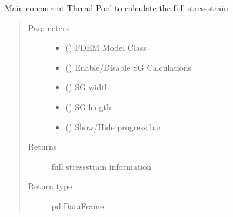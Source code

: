 \documentclass[letterpaper,10pt,english]{sphinxmanual}
\begin{document}
\begin{fulllineitems}
\label{\detokenize{openfdem:openfdem.complete_BD_thread_pool_generators.main}}
Main concurrent Thread Pool to calculate the full stress\sphinxhyphen{}strain
\begin{quote}\begin{description}
\item[{Parameters}] \leavevmode\begin{itemize}
\item {} 
 ({\hyperref[\detokenize{openfdem:openfdem.openfdem.Model}]{}}) \textendash{} FDEM Model Class

\item {} 
 () \textendash{} Enable/Disable SG Calculations

\item {} 
 () \textendash{} SG width

\item {} 
 () \textendash{} SG length

\item {} 
 () \textendash{} Show/Hide progress bar

\end{itemize}

\item[{Returns}] \leavevmode
full stress\sphinxhyphen{}strain information

\item[{Return type}] \leavevmode
pd.DataFrame

\end{description}\end{quote}

\end{fulllineitems}
\end{document}
